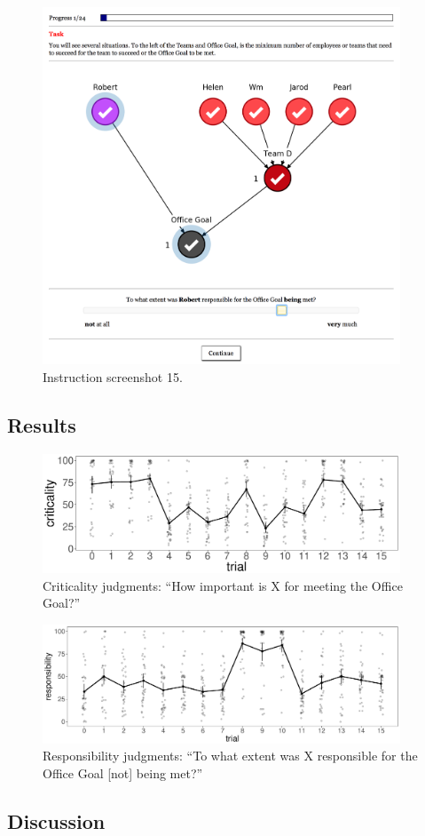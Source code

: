 \documentclass[11pt]{article}
\begin{document}
\begin{figure}[H]
	\centering
	\includegraphics[width=0.95\textwidth]{screenshot_15}
	\caption{Instruction screenshot 15.}
	\label{fig:screenshot_15}
\end{figure}

\subsection{Results}
\label{sub:results}

\begin{figure}[H]
	\centering
	\includegraphics[width=0.95\textwidth]{criticality_judgments}
	\caption{Criticality judgments: ``How important is X for meeting the Office Goal?''}
	\label{fig:criticality_judgments}
\end{figure}

\begin{figure}[H]
	\centering
	\includegraphics[width=0.95\textwidth]{responsibility_judgments}
	\caption{Responsibility judgments: ``To what extent was X responsible for the Office Goal [not] being met?''}
	\label{fig:responsibility_judgments}
\end{figure}

\subsection{Discussion}
\label{sub:discussion}
\end{document}
